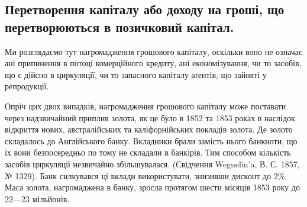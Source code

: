 \subsection{Перетворення капіталу або доходу на гроші, що перетворюються
в позичковий капітал.}

Ми розглядаємо тут нагромадження грошового капіталу, оскільки воно не
означає ані припинення в потоці комерційного кредиту, ані економізування, чи
то засобів, що є дійсно в циркуляції, чи то запасного капіталу аґентів, що зайняті
у репродукції.

Опріч цих двох випадків, нагромадження грошового капіталу може поставати
через надзвичайний приплив золота, як це було в 1852 та 1853 роках
в наслідок відкриття нових, австралійських та каліфорнійських покладів золота.
Де золото складалось до Англійського банку. Вкладники брали замість нього
банкноти, що їх вони безпосередньо по тому не складали в банкірів. Тим способом
кількість засобів циркуляції незвичайно збільшувалася. (Свідчення Weguelin’a,
В. С. 1857, № 1329). Банк силкувався ці вклади використувати, знизивши
дисконт до 2\%. Маса золота, нагромаджена в банку, зросла протягом
шести місяців 1853 року до 22—23 мільйонів.
